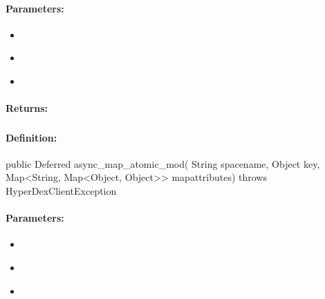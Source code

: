 \paragraph{Parameters:}
\begin{itemize}[noitemsep]
\item {}\\

\item {}\\

\item {}\\

\end{itemize}

\paragraph{Returns:}


\pagebreak
\subsubsection{}
\label{api:java:async_map_atomic_mod}


\paragraph{Definition:}
\begin{javacode}
public Deferred async_map_atomic_mod(
        String spacename,
        Object key,
        Map<String, Map<Object, Object>> mapattributes) throws HyperDexClientException
\end{javacode}

\paragraph{Parameters:}
\begin{itemize}[noitemsep]
\item {}\\

\item {}\\

\item {}\\

\end{itemize}

